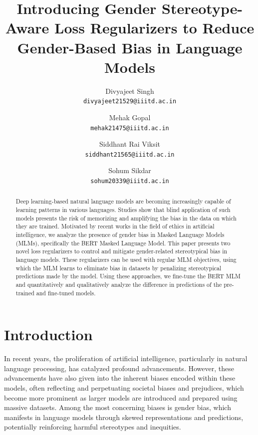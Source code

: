 \documentclass[10pt,twocolumn,letterpaper]{article}
\begin{document}
\title{Introducing Gender Stereotype-Aware Loss Regularizers to Reduce Gender-Based Bias in Language Models}

\author{Divyajeet Singh\\
{\tt\small divyajeet21529@iiitd.ac.in}
\and
Mehak Gopal\\
{\tt\small mehak21475@iiitd.ac.in}
\and
Siddhant Rai Viksit\\
{\tt\small siddhant21565@iiitd.ac.in}
\and
Sohum Sikdar\\
{\tt\small sohum20339@iiitd.ac.in}
}
\maketitle

\begin{abstract}
Deep learning-based natural language models are becoming increasingly capable of learning patterns in various languages.
Studies show that blind application of such models presents the risk of memorizing and amplifying the bias in the data on which they are trained.
Motivated by recent works in the field of ethics in artificial intelligence, we analyze the presence of gender bias in Masked Language Models (MLMs), specifically the BERT Masked Language Model.
This paper presents two novel loss regularizers to control and mitigate gender-related stereotypical bias in language models.
These regularizers can be used with regular MLM objectives, using which the MLM learns to eliminate bias in datasets by penalizing stereotypical predictions made by the model.
Using these approaches, we fine-tune the BERT MLM and quantitatively and qualitatively analyze the difference in predictions of the pre-trained and fine-tuned models.
\end{abstract}

\section{Introduction}
\label{sec:intro}
In recent years, the proliferation of artificial intelligence, particularly in natural language processing, has catalyzed profound advancements.
However, these advancements have also given into the inherent biases encoded within these models, often reflecting and perpetuating societal biases and prejudices, which become more prominent as larger models are introduced and prepared using massive datasets.
Among the most concerning biases is gender bias, which manifests in language models through skewed representations and predictions, potentially reinforcing harmful stereotypes and inequities.
\end{document}
